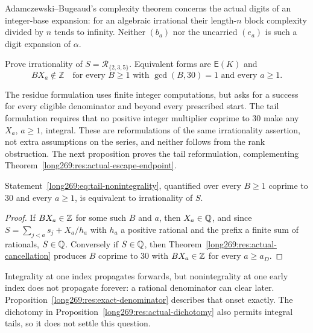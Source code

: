 \documentclass[11pt]{article}
\theoremstyle{remark}
\theoremstyle{plain}
\newcommand{\Esc}{\mathsf E}
\begin{document}
Adamczewski--Bugeaud's complexity theorem
\cite[Theorem~1]{adamczewskibugeaud2007} concerns the actual digits of an
integer-base expansion: for an algebraic irrational their length-$n$ block
complexity divided by $n$ tends to infinity.  Neither $(b_a)$ nor the
uncarried $(e_a)$ is such a digit expansion of $\alpha$.


\begin{problem}
\label{long269:prob:producer}\label{long269:prob:tails269}
Prove irrationality of $S=\mathcal R_{\{2,3,5\}}$.  Equivalent forms are
$\Esc(K)$ and
\begin{equation}\label{long269:eq:tail-nonintegrality}
 BX_a\notin\mathbb Z
 \quad\text{for every }B\ge1\text{ with }\gcd(B,30)=1\text{ and every }a\ge1.
\end{equation}
\end{problem}
The residue formulation uses finite integer computations, but asks for a
success for every eligible denominator and beyond every prescribed start.
The tail formulation requires that no positive integer multiplier
coprime to $30$ make any $X_a$, $a\ge1$, integral.  These are
reformulations of the same irrationality assertion, not extra assumptions
on the series, and neither follows from the rank obstruction.  The next
proposition proves the tail reformulation, complementing
Theorem~\ref{long269:res:actual-escape-endpoint}.

\begin{proposition}
\label{long269:res:tails-equivalence}
Statement~\eqref{long269:eq:tail-nonintegrality}, quantified over every $B\ge1$
coprime to $30$ and every $a\ge1$, is equivalent to irrationality of $S$.
\end{proposition}

\begin{proof}
If $BX_a\in\mathbb{Z}$ for some such $B$ and $a$, then $X_a\in\mathbb{Q}$, and since
$S=\sum_{j<a}s_j+X_a/h_a$ with $h_a$ a positive rational and the prefix a
finite sum of rationals, $S\in\mathbb{Q}$.  Conversely if $S\in\mathbb{Q}$, then
Theorem~\ref{long269:res:actual-cancellation} produces $B$ coprime to $30$ with
$BX_a\in\mathbb{Z}$ for every $a\ge a_D$.
\end{proof}

Integrality at one index propagates forwards, but nonintegrality at one
early index does not propagate forever: a rational denominator can clear
later.  Proposition~\ref{long269:res:exact-denominator} describes that onset
exactly.  The dichotomy in Proposition~\ref{long269:res:actual-dichotomy}
also permits integral tails, so it does not settle this question.
\end{document}

